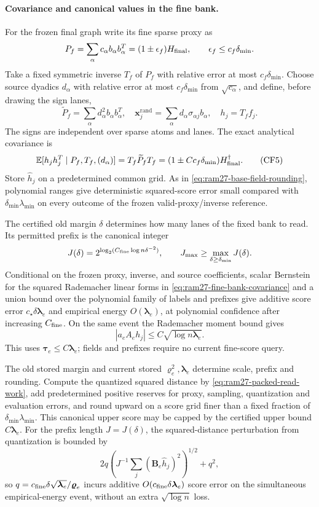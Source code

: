 \documentclass[11pt]{article}
\theoremstyle{remark}
\newcommand{\BB}{\mathbf B}
\newcommand{\llambda}{\boldsymbol{\lambda}}
\newcommand{\ttau}{\boldsymbol{\tau}}
\newcommand{\vvr}{\boldsymbol{\varrho}}
\newcommand{\xxrand}{\mathbf{x}^{\mathrm{rand}}}
\newcommand{\Ex}{\mathbb E}
\begin{document}
\paragraph{Covariance and canonical values in the fine bank.}
For the frozen final graph write its fine sparse proxy as
\[
 P_f=\sum_\alpha c_\alpha b_\alpha b_\alpha^T
             =(1\pm\epsilon_f)H_{\rm final},
 \qquad \epsilon_f\le c_f\delta_{\min}.
\]
Take a fixed symmetric inverse $T_f$ of $P_f$ with relative error at most
$c_f\delta_{\min}$.
Choose source dyadics $d_\alpha$ with relative error at most $c_f\delta_{\min}$
from $\sqrt{c_\alpha}$, and define, before drawing the sign lanes,
\[
 \widetilde P_f=\sum_\alpha d_\alpha^2b_\alpha b_\alpha^T,
 \quad
 \xxrand_j=\sum_\alpha d_\alpha\sigma_{\alpha j}b_\alpha,
 \quad h_j=T_ff_j .
\]
The signs are independent over sparse atoms and lanes.
The exact analytical covariance is
\[
 \Ex[h_jh_j^T\mid P_f,T_f,(d_\alpha)]
       =T_f\widetilde P_fT_f
       =(1\pm Cc_f\delta_{\min})H_{\rm final}^\dagger .
 \tag{CF5}\label{eq:ram27-fine-bank-covariance}
\]
Store $\widehat h_j$ on a predetermined common grid.
As in \eqref{eq:ram27-base-field-rounding}, polynomial ranges give deterministic
squared-score error small compared with $\delta_{\min}\lambda_{\min}$ on every
outcome of the frozen valid-proxy/inverse reference.

The certified old margin $\delta$ determines how many lanes of the fixed bank to
read.
Its permitted prefix is the canonical integer
\[
 J(\delta)=2^{ \log_2(C_{\rm fine}\log n\delta^{-2}) },
 \qquad J_{\max}\ge\max_{\delta\ge\delta_{\min}}J(\delta).
\]
Conditional on the frozen proxy, inverse, and source coefficients, scalar
Bernstein for the squared Rademacher linear forms in
\eqref{eq:ram27-fine-bank-covariance} and a union bound over the polynomial
family of labels and prefixes give additive score error $c_\star\delta\llambda_e$ and
empirical energy $O(\llambda_e)$, at polynomial confidence after increasing
$C_{\rm fine}$.
On the same event the Rademacher moment bound gives
\[
 |a_eA_eh_j|\le C\sqrt{\log n\llambda_e}.
                                                               \tag{O7}\label{eq:ram27-fine-lane-bound}
\]
This uses $\ttau_e\le C\llambda_e$; fields and prefixes require no current
fine-score query.

The old stored margin and current stored $\vvr_e^2,\llambda_e$ determine scale,
prefix and rounding.
Compute the quantized squared distance by \eqref{eq:ram27-packed-read-work}, add
predetermined positive reserves for proxy, sampling, quantization and evaluation
errors, and round upward on a score grid finer than a fixed fraction of
$\delta_{\min}\lambda_{\min}$.
This canonical upper score may be capped by the certified upper bound
$C\llambda_e$.
For the prefix length $J=J(\delta)$, the squared-distance perturbation from
quantization is bounded by
\[
 2q\left(J^{-1}\sum_j(\BB_e\widehat h_j)^2\right)^{1/2}+q^2,
\]
so $q=c_{\rm fine}\delta\sqrt{\llambda_e}/\vvr_e$ incurs additive $O(c_{\rm
fine}\delta\llambda_e)$ score error on the simultaneous empirical-energy event,
without an extra $\sqrt{\log n}$ loss.
\end{document}
